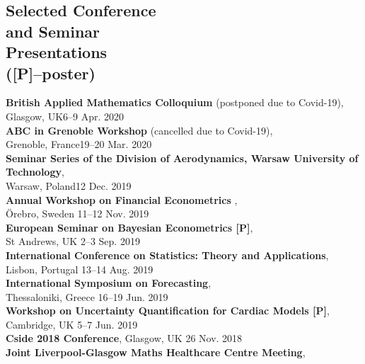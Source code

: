 \documentclass[margin,line]{resume}
\begin{document}
\begin{resume}
\section{\mysidestyle Selected Conference \\and Seminar \\Presentations \\ ([P]--poster)} 
	\textbf{British Applied Mathematics Colloquium} (postponed due to Covid-19),\\
	Glasgow, UK\hfill  6--9 Apr. 2020 \vspace{1mm} \\
	\textbf{ABC in Grenoble Workshop}  (cancelled due to Covid-19),\\
	Grenoble, France\hfill  19--20 Mar. 2020 \vspace{1mm} \\	
	\textbf{Seminar Series of the Division of Aerodynamics, Warsaw University of Technology},\\
	Warsaw, Poland\hfill 12 Dec. 2019 \vspace{1mm} \\
	\textbf{ Annual Workshop on Financial Econometrics },\\
	{\"O}rebro, Sweden \hfill 11--12 Nov. 2019 \vspace{1mm} \\
	\textbf{ European Seminar on Bayesian Econometrics [P]},\\
	St Andrews, UK \hfill 2--3 Sep. 2019 \vspace{1mm} \\
	\textbf{International Conference on Statistics: Theory and Applications},\\
	Lisbon, Portugal \hfill 13--14 Aug. 2019 \vspace{1mm} \\		
	\textbf{ International Symposium on Forecasting},\\
	Thessaloniki, Greece \hfill 16--19 Jun. 2019 \vspace{1mm} \\	
	\textbf{Workshop on Uncertainty Quantification for Cardiac Models [P]},\\
	Cambridge, UK \hfill 5--7 Jun. 2019 \vspace{1mm} \\		
	\textbf{Cside 2018 Conference}, Glasgow, UK \hfill 26 Nov. 2018 \vspace{1mm} \\
	\textbf{ Joint Liverpool-Glasgow Maths Healthcare Centre Meeting},\\

\end{resume}
\end{document}
